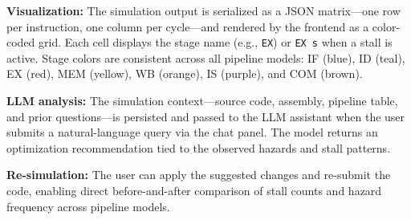\textbf{Visualization:} The simulation output is serialized as a JSON matrix---one row per instruction, one column per cycle---and rendered by the frontend as a color-coded grid. Each cell displays the stage name (e.g., \texttt{EX}) or \texttt{EX s} when a stall is active. Stage colors are consistent across all pipeline models: IF (blue), ID (teal), EX (red), MEM (yellow), WB (orange), IS (purple), and COM (brown).

\textbf{LLM analysis:} The simulation context---source code, assembly, pipeline table, and prior questions---is persisted and passed to the LLM assistant when the user submits a natural-language query via the chat panel. The model returns an optimization recommendation tied to the observed hazards and stall patterns.

\textbf{Re-simulation:} The user can apply the suggested changes and re-submit the code, enabling direct before-and-after comparison of stall counts and hazard frequency across pipeline models.